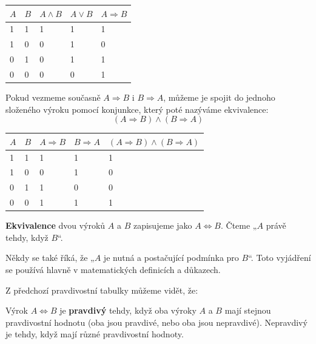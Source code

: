 \documentclass[12pt,a4paper]{article}
\begin{document}
\begin{center}
\renewcommand{\arraystretch}{1.2}
\begin{tabular}{|C{1cm}|C{1cm}|C{1.5cm}|C{1.5cm}|C{1.5cm}|}
\hline
$A$ & $B$ & $A \land B$ & $A \lor B$ & $A \Rightarrow B$ \\
 & 1 & 1 & 1 & 1 \\
1 & 0 & 0 & 1 & 0 \\
0 & 1 & 0 & 1 & 1 \\
0 & 0 & 0 & 0 & 1 \\
\hline
\end{tabular}
\end{center}

Pokud vezmeme současně $A \Rightarrow B$ i $B \Rightarrow A$, můžeme je spojit do jednoho složeného výroku pomocí konjunkce, který poté nazýváme ekvivalence:  
\[
(A \Rightarrow B) \land (B \Rightarrow A)
\]

\begin{center}
\renewcommand{\arraystretch}{1.2}
\begin{tabular}{|C{1cm}|C{1cm}|C{1.5cm}|C{1.5cm}|C{4cm}|}
\hline
$A$ & $B$ & $A \Rightarrow B$ & $B \Rightarrow A$ & $(A \Rightarrow B) \land (B \Rightarrow A)$ \\
 & 1 & 1 & 1 & 1\\
1 & 0 & 0 & 1 & 0\\
0 & 1 & 1 & 0 & 0\\
0 & 0 & 1 & 1 & 1\\
\hline
\end{tabular}
\end{center}

\begin{definitionbox}
\textbf{Ekvivalence} dvou výroků $A$ a $B$ zapisujeme jako $A \Leftrightarrow B$.  
Čteme „$A$ právě tehdy, když $B$“.
\end{definitionbox}

\begin{notebox}
Někdy se také říká, že „$A$ je nutná a postačující podmínka pro $B$“.  
Toto vyjádření se používá hlavně v matematických definicích a důkazech.
\end{notebox}

Z předchozí pravdivostní tabulky můžeme vidět, že: 

\begin{definitionbox}
    Výrok $A \Leftrightarrow B$ je \textbf{pravdivý} tehdy, když oba výroky $A$ a $B$ mají stejnou pravdivostní hodnotu  
    (oba jsou pravdivé, nebo oba jsou nepravdivé).  
    Nepravdivý je tehdy, když mají různé pravdivostní hodnoty.
\end{definitionbox}
\end{document}
